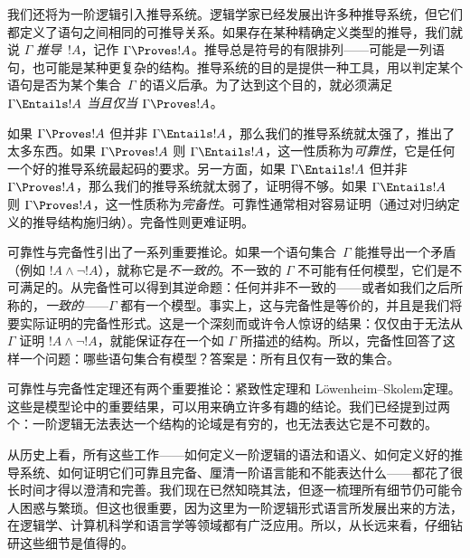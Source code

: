 \documentclass[../../../include/open-logic-section]{subfiles}
\begin{document}


我们还将为一阶逻辑引入推导系统。逻辑学家已经发展出许多种推导系统，但它们都定义了语句之间相同的可推导关系。如果存在某种精确定义类型的推导，我们就说 $\Gamma$ \emph{推导}~$!A$，记作 $\Gamma \Proves !A$。推导总是符号的有限排列——可能是一列语句，也可能是某种更复杂的结构。推导系统的目的是提供一种工具，用以判定某个语句是否为某个集合~$\Gamma$ 的语义后承。为了达到这个目的，就必须满足 $\Gamma \Entails !A$ \emph{当且仅当} $\Gamma \Proves !A$。

如果 $\Gamma \Proves !A$ 但并非 $\Gamma \Entails !A$，那么我们的推导系统就太强了，推出了太多东西。如果 $\Gamma \Proves !A$ 则 $\Gamma \Entails !A$，这一性质称为\emph{可靠性}，它是任何一个好的推导系统最起码的要求。另一方面，如果 $\Gamma \Entails !A$ 但并非 $\Gamma \Proves !A$，那么我们的推导系统就太弱了，证明得不够。如果 $\Gamma \Entails !A$ 则 $\Gamma \Proves !A$，这一性质称为\emph{完备性}。可靠性通常相对容易证明（通过对归纳定义的推导结构施归纳）。完备性则更难证明。

可靠性与完备性引出了一系列重要推论。如果一个语句集合~$\Gamma$ 能推导出一个矛盾（例如 $!A \land \lnot !A$），就称它是\emph{不一致的}。不一致的 $\Gamma$ 不可能有任何模型，它们是不可满足的。从完备性可以得到其逆命题：任何并非不一致的——或者如我们之后所称的，\emph{一致的}——$\Gamma$ 都有一个模型。事实上，这与完备性是等价的，并且是我们将要实际证明的完备性形式。这是一个深刻而或许令人惊讶的结果：仅仅由于无法从 $\Gamma$ 证明 $!A \land \lnot !A$，就能保证存在一个如 $\Gamma$ 所描述的结构。所以，完备性回答了这样一个问题：哪些语句集合有模型？答案是：所有且仅有一致的集合。

可靠性与完备性定理还有两个重要推论：紧致性定理和 Löwenheim--Skolem定理。这些是模型论中的重要结果，可以用来确立许多有趣的结论。我们已经提到过两个：一阶逻辑无法表达一个结构的论域是有穷的，也无法表达它是不可数的。

从历史上看，所有这些工作——如何定义一阶逻辑的语法和语义、如何定义好的推导系统、如何证明它们可靠且完备、厘清一阶语言能和不能表达什么——都花了很长时间才得以澄清和完善。我们现在已然知晓其法，但逐一梳理所有细节仍可能令人困惑与繁琐。但这也很重要，因为这里为一阶逻辑形式语言所发展出来的方法，在逻辑学、计算机科学和语言学等领域都有广泛应用。所以，从长远来看，仔细钻研这些细节是值得的。
\end{document}
